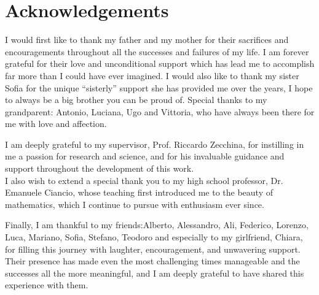 \documentclass[a4paper,12pt]{report}
\begin{document}

\thispagestyle{empty}
\noindent


\thispagestyle{empty}\mbox{}\newpage
\thispagestyle{empty}\mbox{}\newpage
\thispagestyle{empty}
\chapter*{Acknowledgements}
I would first like to thank my father and my mother for their sacrifices and 
encouragements throughout all the successes and failures of my life. I am forever 
grateful for their love and unconditional support which has lead me to accomplish far 
more than I could have ever imagined. I would also like to thank my sister Sofia for the unique ``sisterly'' support she 
has provided me over the years, I hope to always be a big brother you can be proud of. 
Special thanks to my grandparent: Antonio, Luciana, Ugo and Vittoria, who have always 
been there for me with love and affection.

I am deeply grateful to my supervisor, Prof. Riccardo Zecchina, for instilling in me 
a passion for research and science, and for his invaluable guidance and support 
throughout the development of this work.\\
I also wish to extend a special thank you to my high school professor, Dr. Emanuele Ciancio, 
whose teaching first introduced me to the beauty of mathematics, which I continue to 
pursue with enthusiasm ever since.

Finally, I am thankful to my friends:Alberto, Alessandro, Ali, Federico, Lorenzo, Luca, 
Mariano, Sofia, Stefano, Teodoro and especially to my girlfriend, Chiara, for filling 
this journey with laughter, encouragement, and unwavering support. Their presence 
has made even the most challenging times manageable and the successes all the more 
meaningful, and I am deeply grateful to have shared this experience with them.\\
\end{document}
